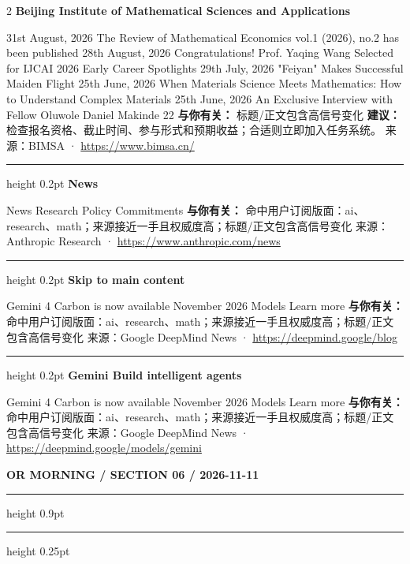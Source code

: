 \documentclass[10.5pt]{ctexart}
\begin{document}
\begin{multicols}{2}
{\large\bfseries Beijing Institute of Mathematical Sciences and Applications}\par
31st August, 2026 The Review of Mathematical Economics vol.1 (2026), no.2 has been published 28th August, 2026 Congratulations! Prof. Yaqing Wang Selected for IJCAI 2026 Early Career Spotlights 29th July, 2026 "Feiyan" Makes Successful Maiden Flight 25th June, 2026 When Materials Science Meets Mathematics: How to Understand Complex Materials 25th June, 2026 An Exclusive Interview with Fellow Oluwole Daniel Makinde 22
\textbf{与你有关：} 标题/正文包含高信号变化
\textbf{建议：} 检查报名资格、截止时间、参与形式和预期收益；合适则立即加入任务系统。
{\footnotesize\color{ormuted} 来源：BIMSA · \url{https://www.bimsa.cn/}}
\vspace{2mm}
\hrule height 0.2pt
\vspace{2mm}
{\large\bfseries News}\par
News Research Policy Commitments
\textbf{与你有关：} 命中用户订阅版面：ai、research、math；来源接近一手且权威度高；标题/正文包含高信号变化
{\footnotesize\color{ormuted} 来源：Anthropic Research · \url{https://www.anthropic.com/news}}
\vspace{2mm}
\hrule height 0.2pt
\vspace{2mm}
{\large\bfseries Skip to main content}\par
Gemini 4 Carbon is now available November 2026 Models Learn more
\textbf{与你有关：} 命中用户订阅版面：ai、research、math；来源接近一手且权威度高；标题/正文包含高信号变化
{\footnotesize\color{ormuted} 来源：Google DeepMind News · \url{https://deepmind.google/blog}}
\vspace{2mm}
\hrule height 0.2pt
\vspace{2mm}
{\large\bfseries Gemini Build intelligent agents}\par
Gemini 4 Carbon is now available November 2026 Models Learn more
\textbf{与你有关：} 命中用户订阅版面：ai、research、math；来源接近一手且权威度高；标题/正文包含高信号变化
{\footnotesize\color{ormuted} 来源：Google DeepMind News · \url{https://deepmind.google/models/gemini}}
\end{multicols}
\newpage
{\small\bfseries OR MORNING / SECTION 06 / 2026-11-11}
\vspace{2mm}
\hrule height 0.9pt
\vspace{1.5mm}
\hrule height 0.25pt
\vspace{4mm}
\end{document}
